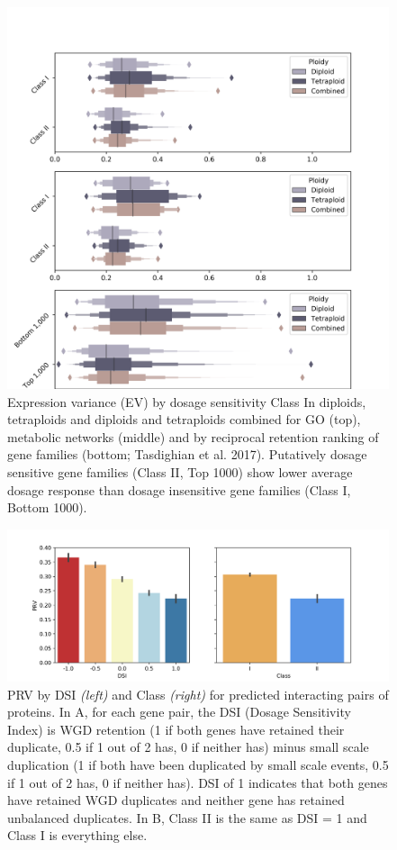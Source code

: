 \documentclass[11pt]{article}
\begin{document}
\begin{figure}[h!]
   \includegraphics[width=\linewidth]{../figures/EV_boxen.png}
\caption{Expression variance (EV) by dosage sensitivity Class In diploids, tetraploids and diploids and tetraploids combined for GO (top), metabolic networks (middle) and by reciprocal retention ranking of gene families (bottom; Tasdighian et al. 2017). Putatively dosage sensitive gene families (Class II, Top 1000) show lower average dosage response than dosage insensitive gene families (Class I, Bottom 1000).}
 \label{fig5}
\end{figure}


\begin{figure}[h!]
   \includegraphics[width=\linewidth]{../figures/sppi.png}
\caption{PRV by DSI \textit{(left)} and Class \textit{(right)} for predicted interacting pairs of proteins. In A, for each gene pair, the DSI (Dosage Sensitivity Index) is WGD retention (1 if both genes have retained their duplicate, 0.5 if 1 out of 2 has, 0 if neither has) minus small scale duplication (1 if both have been duplicated by small scale events, 0.5 if 1 out of 2 has, 0 if neither has). DSI of 1 indicates that both genes have retained WGD duplicates and neither gene has retained unbalanced duplicates. In B, Class II is the same as DSI = 1 and Class I is everything else. %
}
 \label{fig6}
\end{figure}



\end{document}
